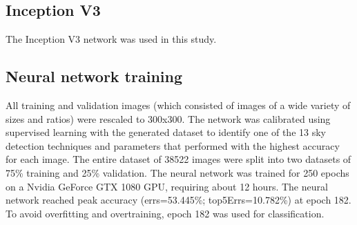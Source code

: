 \documentclass[final,3p,times,authoryear]{elsarticle}
\begin{document}
\subsection{Inception V3}\label{sec:inception}
The Inception V3 network was used in this study. 


\subsection{Neural network training}\label{sec:nntraining}    

 All training and validation images (which consisted of images of a wide variety of sizes and ratios) were rescaled to 300x300. The network was calibrated using supervised learning with the generated dataset to identify one of the 13 sky detection techniques and parameters that performed with the highest accuracy for each image. The entire dataset of 38522 images were split into two datasets of 75\% training and 25\% validation. The neural network was trained for 250 epochs on a Nvidia GeForce GTX 1080 GPU, requiring about 12 hours. The neural network reached peak accuracy (errs=53.445\%; top5Errs=10.782\%) at epoch 182. To avoid overfitting and overtraining, epoch 182 was used for classification.

\end{document}

